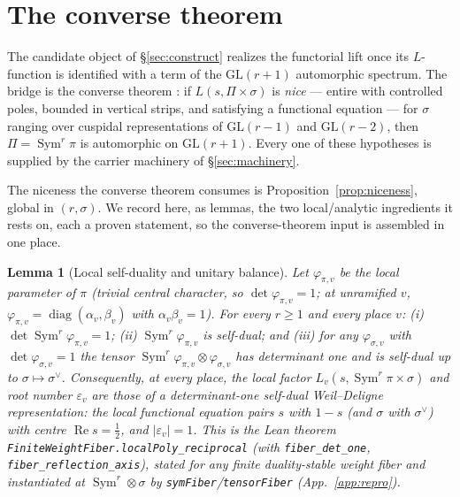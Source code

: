 \documentclass[11pt]{article}
\newtheorem{lemma}[theorem]{Lemma}
\theoremstyle{definition}
\renewcommand{\Re}{\operatorname{Re}}
\newcommand{\Sym}{\operatorname{Sym}}
\begin{document}
\section{The converse theorem}\label{sec:converse}

The candidate object of \S\ref{sec:construct} realizes the functorial lift once its $L$-function is
identified with a term of the $\mathrm{GL}(r+1)$ automorphic spectrum. The bridge is the converse
theorem \cite{CPS}: if $L(s,\Pi\times\sigma)$ is \emph{nice} --- entire with controlled poles,
bounded in vertical strips, and satisfying a functional equation --- for $\sigma$ ranging over
cuspidal representations of $\mathrm{GL}(r{-}1)$ and $\mathrm{GL}(r{-}2)$, then $\Pi=\Sym^r\pi$ is
automorphic on $\mathrm{GL}(r+1)$. Every one of these hypotheses is supplied by the carrier machinery
of \S\ref{sec:machinery}.

The niceness the converse theorem consumes is Proposition~\ref{prop:niceness}, global in $(r,\sigma)$.
We record here, as lemmas, the two local/analytic ingredients it rests on, each a proven statement, so
the converse-theorem input is assembled in one place.

\begin{lemma}[Local self-duality and unitary balance]\label{lem:selfdual}
Let $\varphi_{\pi,v}$ be the local parameter of $\pi$ (trivial central character, so
$\det\varphi_{\pi,v}=1$; at unramified $v$, $\varphi_{\pi,v}=\operatorname{diag}(\alpha_v,\beta_v)$ with
$\alpha_v\beta_v=1$). For every $r\ge1$ and every place $v$: \textup{(i)} $\det\Sym^r\varphi_{\pi,v}=1$;
\textup{(ii)} $\Sym^r\varphi_{\pi,v}$ is self-dual; and \textup{(iii)} for any $\varphi_{\sigma,v}$ with
$\det\varphi_{\sigma,v}=1$ the tensor $\Sym^r\varphi_{\pi,v}\otimes\varphi_{\sigma,v}$ has determinant one
and is self-dual up to $\sigma\mapsto\sigma^\vee$. Consequently, at every place, the local factor
$L_v(s,\Sym^r\pi\times\sigma)$ and root number $\varepsilon_v$ are those of a determinant-one self-dual
Weil--Deligne representation: the local functional equation pairs $s$ with $1-s$ (and $\sigma$ with
$\sigma^\vee$) with centre $\Re s=\tfrac12$, and $|\varepsilon_v|=1$. This is the Lean theorem
\texttt{FiniteWeightFiber.localPoly\_reciprocal} (with \texttt{fiber\_det\_one},
\texttt{fiber\_reflection\_axis}), stated for any finite duality-stable weight fiber and instantiated at
$\Sym^r\otimes\sigma$ by \texttt{symFiber}/\texttt{tensorFiber} (App.~\ref{app:repro}).
\end{lemma}
\end{document}
